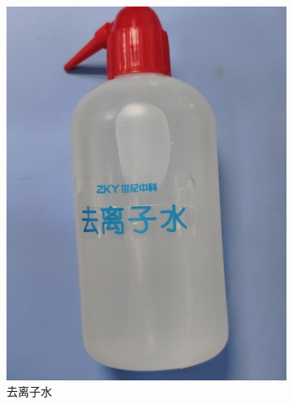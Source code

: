 \documentclass[a4paper]{report} %
\begin{document}
\begin{figure}[H]
\begin{subfigure}{0.22\textwidth}
        \includegraphics[width=\linewidth]{去离子水.jpg}
        \caption{去离子水}
    \end{subfigure}
    \begin{subfigure}{0.22\textwidth}

\end{subfigure}
\end{figure}
\end{document}
